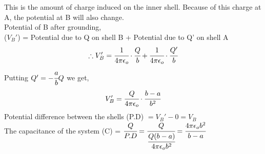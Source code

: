    This is the amount of charge induced on the inner shell. Because of this charge at A, the potential at B will also change. \\
   Potential of B after grounding,\\
   ($V_B'$) = Potential due to Q on shell B + Potential due to Q' on shell A
   \[\therefore V_B' = \cfrac{1}{4 \pi \epsilon_o}\cdot \cfrac{Q}{b} + \cfrac{1}{4 \pi \epsilon_o}\cdot \cfrac{Q'}{b} \]
   Putting  $Q' = -\cfrac{a}{b} Q$ we get,
   \[ V_B' = \cfrac{Q}{4 \pi \epsilon_o}\cdot \cfrac{b -a}{b^2} \]
Potential difference between the shells (P.D) $= V_B' - 0 = V_B$
\vspace{3pt}
\\
The capacitance of the system (C) = $\cfrac{Q}{P.D} = \cfrac{Q}{\cfrac{Q (b - a)}{4 \pi \epsilon_o b^2}} = \cfrac{4 \pi \epsilon_o b^2}{b - a}$






\newpage
